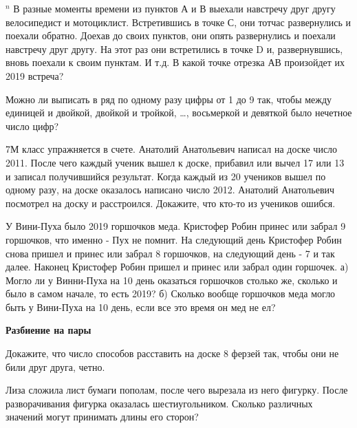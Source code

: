 \begin{thm}$^n$\label{1.21} В разные моменты времени из пунктов А и В выехали навстречу друг другу велосипедист и мотоциклист. Встретившись в точке С, они тотчас развернулись и поехали обратно. Доехав до своих пунктов, они опять развернулись и поехали навстречу друг другу. На этот раз они встретились в точке D и, развернувшись, вновь поехали к своим пунктам. И т.д. В какой точке отрезка АВ произойдет их 2019 встреча?
\end{thm}

\begin{thm}\label{1.14}Можно ли выписать в ряд по одному разу цифры от 1 до 9 так, чтобы между единицей и двойкой, двойкой и тройкой, \dots, восьмеркой и девяткой было нечетное число цифр?
\end{thm}

\begin{thm}\label{1.15}7М класс упражняется в счете. Анатолий Анатольевич написал на доске число 2011. После чего каждый ученик вышел к доске, прибавил или вычел 17 или 13 и записал получившийся результат. Когда каждый из 20 учеников вышел по одному разу, на доске оказалось написано число 2012. Анатолий Анатольевич посмотрел на доску и расстроился. Докажите, что кто-то из учеников ошибся.
\end{thm}

\begin{thm}\label{1.16}
	У Вини-Пуха было 2019 горшочков меда. Кристофер Робин принес или забрал 9 горшочков, что именно - Пух не помнит. На следующий день Кристофер Робин снова пришел и принес или забрал 8 горшочков, на следующий день - 7 и так далее. Наконец Кристофер Робин пришел и принес или забрал один горшочек.  а) Могло ли у Винни-Пуха на 10 день оказаться горшочков столько же, сколько и было в самом начале, то есть 2019? б) Сколько вообще горшочков меда могло быть у Вини-Пуха на 10 день, если все это время он мед не ел?
\end{thm}
\begin{center}
	\textbf{Разбиение на пары}
\end{center}
\begin{thm}
	Докажите, что число способов расставить на доске 8 ферзей так, чтобы они не били друг друга, четно.
\end{thm}

\begin{thm}
	Лиза сложила лист бумаги пополам, после чего вырезала из него фигурку. После разворачивания фигурка оказалась шестиугольником. Сколько различных значений могут принимать длины его сторон?
\end{thm}

